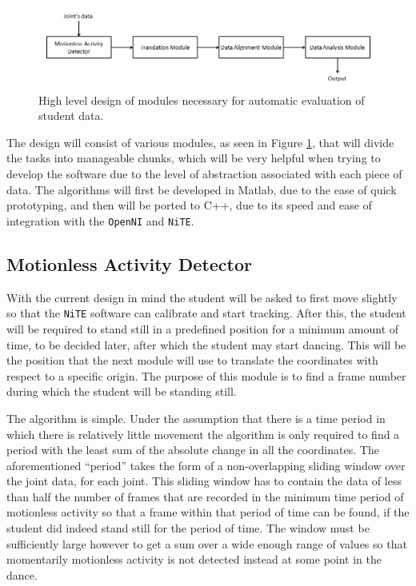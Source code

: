 \documentclass[11pt,a4paper]{article}
\begin{document}
\begin{figure}[H]
\centering
\includegraphics[scale=0.6]{data_analysis_modules.jpg}
\caption{High level design of modules necessary for automatic evaluation of student data.}
\label{modules}
\end{figure}
 
\noindent The design will consist of various modules, as seen in Figure \ref{modules}, that will divide the tasks into manageable chunks, which will be very helpful when trying to develop the software due to the level of abstraction associated with each piece of data. The algorithms will first be developed in Matlab, due to the ease of quick prototyping, and then will be ported to C++, due to its speed and ease of integration with the \texttt{OpenNI} and \texttt{NiTE}. 

\subsection{Motionless Activity Detector}
\noindent 
With the current design in mind the student will be asked to first move slightly so that the \texttt{NiTE} software can calibrate and start tracking. After this, the student will be required to stand still in a predefined position for a minimum amount of time, to be decided later, after which the student may start dancing. This will be the position that the next module will use to translate the coordinates with respect to a specific origin. The purpose of this module is to find a frame number during which the student will be standing still. 

\noindent 
The algorithm is simple. Under the assumption that there is a time period in which there is relatively little movement the algorithm is only required to find a period with the least sum of the absolute change in all the coordinates. The aforementioned ``period'' takes the form of a non-overlapping sliding window over the joint data, for each joint. This sliding window has to contain the data of less than half the number of frames that are recorded in the minimum time period of motionless activity so that a frame within that period of time can be found, if the student did indeed stand still for the period of time. The window must be sufficiently large however to get a sum over a wide enough range of values so that momentarily motionless activity is not detected instead at some point in the dance. 
\end{document}
